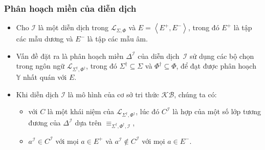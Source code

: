 \documentclass[notheorems,xcolor=dvipsnames]{beamer}
\newcommand{\mL}		{\mathcal{L}}
\newcommand{\mI}		{\mathcal{I}}
\newcommand{\mbY}		{\mathbb{Y}}
\newcommand{\SigmaDag}	{\Sigma^\dag}
\newcommand{\PhiDag}	{\Phi^\dag}
\newcommand{\KB}		{\mathcal{KB}}
\newcommand{\mLSP}		{\mL_{\Sigma,\Phi}}
\newcommand{\mLSPD}		{\mL_{\Sigma^\dag,\Phi^\dag}}
\newcommand{\SdPdI}		{{\SigmaDag,\Phi^\dag,\mI}}
\newcommand{\tuple}[1]	{\left\langle#1\right\rangle\!}
\begin{document}
\begin{frame}\frametitle{\bf Phân hoạch miền của diễn dịch}
	
	\begin{itemize}
		\setlength{\itemsep}{1.5ex}
		\item Cho $\mI$ là một diễn dịch trong $\mLSP$ và $E = \tuple{E^+, E^-}$, trong đó $E^+$ là tập các mẫu dương và $E^-$ là tập các mẫu âm.
		
		\item Vấn đề đặt ra là phân hoạch miền $\Delta^\mI$ của diễn dịch~$\mI$ sử dụng các bộ chọn trong ngôn ngữ $\mLSPD$, trong đó $\SigmaDag \subseteq \Sigma$ và $\PhiDag \subseteq \Phi$, để đạt được phân hoạch $\mbY$ nhất quán với $E$.
		
		\item Khi diễn dịch $\mI$ là mô hình của cơ sở tri thức $\KB$, chúng ta có:
		\begin{itemize}
			\setlength{\itemsep}{1.5ex}
			\item với $C$ là một khái niệm của $\mLSPD$, lúc đó $C^\mI$ là hợp của một số lớp tương đương của $\Delta^\mI$ dựa trên $\equiv_\SdPdI$,
			\item $a^\mI \in C^\mI$ với mọi $a \in E^+$ và $a^\mI \not\in C^\mI$ với mọi $a \in E^-$.
		\end{itemize}
	\end{itemize}
\end{frame}
\end{document}
